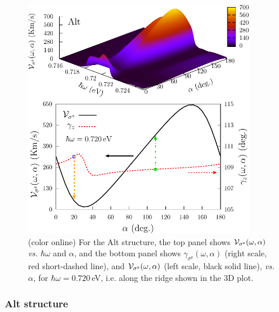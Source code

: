 \documentclass[floatfix,prb,aps,superscriptaddress,showpacs,11pt,preprint,letterpaper]{revtex4}
\def\tama{10cm}
\begin{document}
\begin{figure}[tb]
\centering
\includegraphics[width=\tama]{fig6}
\caption{(color online) For the Alt structure, the top panel
shows ${\cal V}_{\sigma^\mathrm{z}} (\omega,\alpha)$ {\it vs.} $\hbar\omega$
and $\alpha$, and the bottom panel shows $\gamma_{\sigma^\mathrm{z}}
(\omega,\alpha)$ (right scale, red short-dashed  line), and ${\cal V}_{\sigma^\mathrm{z}}
(\omega,\alpha)$ (left scale, black solid line), {\it vs.} $\alpha$, for
$\hbar\omega=0.720$\,eV, i.e. along the ridge shown in the 3D plot.}
\label{fig:alt-vsz}
\end{figure}

\subsubsection{Alt structure}
\end{document}
